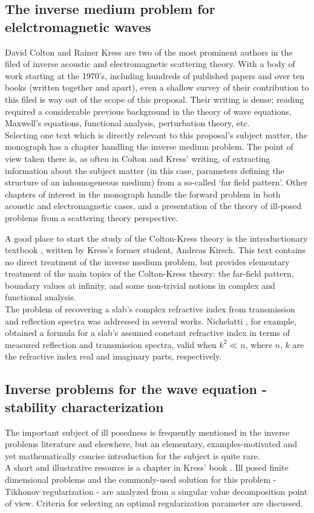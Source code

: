 \documentclass[12pt,twoside]{report}
\begin{document}
\subsection{The inverse medium problem for elelctromagnetic waves}
David Colton and Rainer Kress are two of the most prominent authors in the filed of inverse acoustic and electromagnetic scattering theory. With a body of work starting at the 1970's, including  hundreds of published papers and over ten books (written together and apart), even a shallow survey of their contribution to this filed is way out of the scope of this proposal. Their writing is dense; reading required a considerable previous background in the theory of wave equations, Maxwell's equations, functional analysis, perturbation theory, etc. \\
Selecting one text which is directly relevant to this proposal's subject matter, the monograph \cite{ColtonKress1998} has a chapter handling the inverse medium problem. The point of view taken there is, as often in Colton and Kress' writing, of extracting information about the subject matter (in this case, parameters defining the structure of an inhomogeneous medium) from a so-called `far field pattern'. Other chapters of interest in the monograph handle the forward problem in both acoustic and electromagnetic cases, and a presentation of the theory of ill-posed problems from a scattering theory perspective. 

A good place to start the study of the Colton-Kress theory is the introductionary textbook \cite{Kirsch2011}, written by Kress's former student, Andreas Kirsch. This text contains no direct treatment of the inverse medium problem, but provides elementary treatment of the main topics of the Colton-Kress theory: the far-field pattern, boundary values at infinity, and some non-trivial notions in complex and functional analysis.\\

The problem of recovering a slab's complex refractive index from transmission and reflection spectra was addressed in several works. Nichelatti \cite{Nichelatti2002}, for example, obtained a formula for a slab's assumed constant refractive index in terms of measured reflection and transmission spectra, valid when $k^2 \ll n$, where $n$, $k$ are the refractive index real and imaginary parts, respectively.

\subsection{Inverse problems for the wave equation - stability characterization}
The important subject of ill posedness is frequently mentioned in the inverse problems literature and elsewhere, but an elementary, examples-motivated and yet mathematically concise introduction for the subject is quite rare.\\
A short and illustrative resource is a chapter in Kress' book \cite{Kress1997}. Ill posed finite dimensional problems and the commonly-used solution for this problem - Tikhonov regularization - are analyzed from a singular value decomposition point of view. Criteria for selecting an optimal 
regularization parameter are discussed.\\
\end{document}
